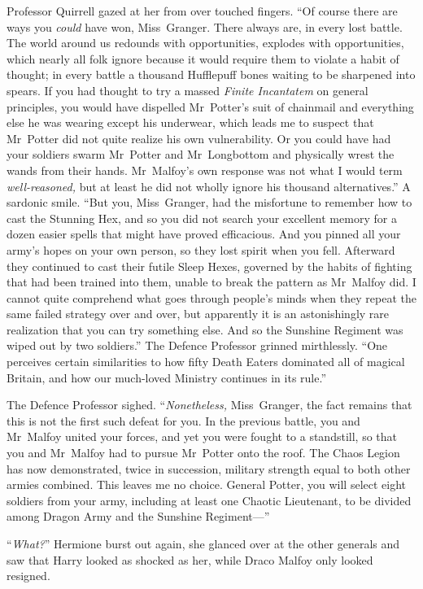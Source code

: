 Professor Quirrell gazed at her from over touched fingers. “Of course there are ways you \emph{could} have won, Miss~Granger. There always are, in every lost battle. The world around us redounds with opportunities, explodes with opportunities, which nearly all folk ignore because it would require them to violate a habit of thought; in every battle a thousand Hufflepuff bones waiting to be sharpened into spears. If you had thought to try a massed \emph{Finite Incantatem} on general principles, you would have dispelled Mr~Potter’s suit of chainmail and everything else he was wearing except his underwear, which leads me to suspect that Mr~Potter did not quite realize his own vulnerability. Or you could have had your soldiers swarm Mr~Potter and Mr~Longbottom and physically wrest the wands from their hands. Mr~Malfoy’s own response was not what I would term \emph{well-reasoned,} but at least he did not wholly ignore his thousand alternatives.” A sardonic smile. “But you, Miss~Granger, had the misfortune to remember how to cast the Stunning Hex, and so you did not search your excellent memory for a dozen easier spells that might have proved efficacious. And you pinned all your army’s hopes on your own person, so they lost spirit when you fell. Afterward they continued to cast their futile Sleep Hexes, governed by the habits of fighting that had been trained into them, unable to break the pattern as Mr~Malfoy did. I cannot quite comprehend what goes through people’s minds when they repeat the same failed strategy over and over, but apparently it is an astonishingly rare realization that you can try something else. And so the Sunshine Regiment was wiped out by two soldiers.” The Defence Professor grinned mirthlessly. “One perceives certain similarities to how fifty Death Eaters dominated all of magical Britain, and how our much-loved Ministry continues in its rule.”

The Defence Professor sighed. “\emph{Nonetheless,} Miss~Granger, the fact remains that this is not the first such defeat for you. In the previous battle, you and Mr~Malfoy united your forces, and yet you were fought to a standstill, so that you and Mr~Malfoy had to pursue Mr~Potter onto the roof. The Chaos Legion has now demonstrated, twice in succession, military strength equal to both other armies combined. This leaves me no choice. General Potter, you will select eight soldiers from your army, including at least one Chaotic Lieutenant, to be divided among Dragon Army and the Sunshine Regiment—”

“\emph{What?}” Hermione burst out again, she glanced over at the other generals and saw that Harry looked as shocked as her, while Draco Malfoy only looked resigned.

